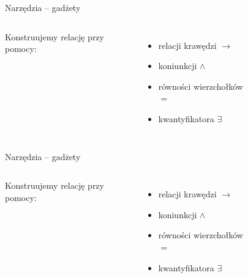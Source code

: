 
\begin{frame}{Narzędzia -- gadżety}

\begin{columns}
    Konstruujemy relację przy pomocy:
    \begin{itemize}
        \item relacji krawędzi \(\to\)
        \item koniunkcji \(\land\)
        \item \textcolor{cfblue}{równości wierzchołków \(=\)}
        \item kwantyfikatora \(\exists\)
    \end{itemize}

\begin{figure}
    \centering
    
\end{figure}
\end{columns}

\end{frame}


\begin{frame}{Narzędzia -- gadżety}

\begin{columns}
    Konstruujemy relację przy pomocy:
    \begin{itemize}
        \item relacji krawędzi \(\to\)
        \item koniunkcji \(\land\)
        \item równości wierzchołków \(=\)
        \item \textcolor{cfblue}{kwantyfikatora \(\exists\)}
    \end{itemize}

\begin{figure}
    \centering
    
\end{figure}
\end{columns}

\end{frame}







